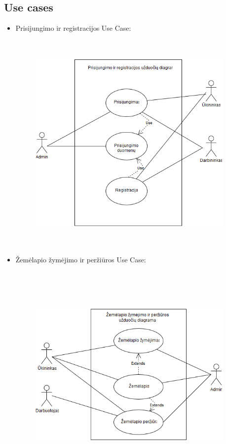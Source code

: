 \documentclass[oneside]{VUMIFPSkursinis}
\begin{document}
\subsection{Use cases}
\begin{itemize}
\item Prisijungimo ir registracijos Use Case:
\begin {figure}[H]
	\centering
		\includegraphics[width=10cm,height=11cm,keepaspectratio]{Use_case_prisijungimas_registracija.png}
	\caption{}
	\label{fig:Use_case_prisijungimas_registracija}
\end{figure}
\item Žemėlapio žymėjimo ir peržiūros Use Case:
\begin {figure}[H]
	\centering
		\includegraphics[width=10cm,height=11cm,keepaspectratio]{Use_case_zemelapio_zymejimas.png}

\end{figure}
\end{itemize}
\end{document}
